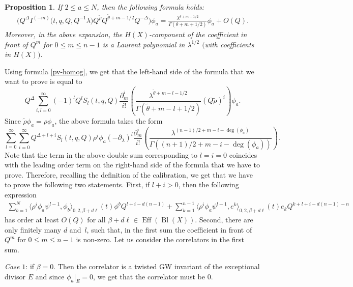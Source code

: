 \documentclass[pdftex]{sigma}
\numberwithin{equation}{section}
\newtheorem{Proposition}[Theorem]{Proposition}
\begin{document}
\begin{Proposition}\label{prop:Q-exp_phia}
If $2\leq a\leq N$, then the following formula holds:
\begin{align*}
\big(
Q^\Delta
I^{(-m)}\big(t,q,Q, Q^{-1}\lambda\big)
Q^{\widetilde{\rho}} Q^{\widetilde{\theta}+m-1/2}
Q^{-\Delta} \big) \phi_a =
\frac{
\lambda^{\theta+m-1/2}
}{
\Gamma(\theta+m+1/2)} \phi_a + O(Q).
\end{align*}
Moreover, in the above expansion, the $H(X)$-component of the coefficient in front of $Q^m$ for $0\leq m\leq n-1$ is a Laurent polynomial in $\lambda^{1/2}$
$($with coefficients in $H(X))$.
\end{Proposition}
\proof
Using formula \eqref{pv-homog}, we get that the left-hand side of the formula that we want to prove is equal to
\[
Q^\Delta
\sum_{i,l=0}^\infty
(-1)^l Q^l S_l(t,q,Q)
\frac{\partial_m^i}{i!}\left(
\frac{\lambda^{\widetilde{\theta}+m-l-1/2}}{
\Gamma(\widetilde{\theta}+m-l+1/2)}
(Q\widetilde{\rho})^i \right)
\phi_a.
\]
Since $\widetilde{\rho} \phi_a = \rho \phi_a$, the above formula takes the form
\begin{equation}\label{rho-component}
\sum_{l=0}^\infty
\sum_{i=0}^\infty
Q^{\Delta+l+i} S_l(t,q,Q) \rho^i\phi_a
(-\partial_\lambda)^l
\frac{\partial_m^i}{i!}\left(
\frac{\lambda^{(n-1)/2+m-i-\operatorname{deg}(\phi_a)}}{
\Gamma((n+1)/2+m-i-\operatorname{deg}(\phi_a))}
\right).
\end{equation}
Note that the term in the above double sum corresponding to $l=i=0$ coincides with the leading order term on the right-hand side of the formula that we have to prove. Therefore, recalling the definition of the calibration, we get that we have to prove the following two statements. First, if $l+i>0$, then the following expression
\begin{align*}%
\sum_{b=1}^N\!
\big\langle \rho^i\phi_a \psi^{l-1},\phi_b\big\rangle_{0,2,\beta+d\ell} (t) \phi^b Q^{l+i-d(n-1)} +
\sum_{k=1}^{n-1}\!
\big\langle \rho^i\phi_a \psi^{l-1}, e^k\big\rangle_{0,2,\beta+d\ell} (t) e_k Q^{k+l+i-d(n-1)-n}
\end{align*}
has order at least $O(Q)$ for all $\beta+d\ell\in \operatorname{Eff}(\operatorname{Bl}(X))$. Second, there are only finitely many $d$ and~$l$, such that, in the first sum the coefficient in front of $Q^m$ for $0\leq m\leq n-1$ is non-zero. Let us consider the correlators in the first sum.

{\em Case $1$}: if $\beta=0$. Then the correlator is a twisted GW invariant of the exceptional divisor $E$ and since $\phi_a|_E=0$, we get that the correlator must be $0$.
\end{document}
